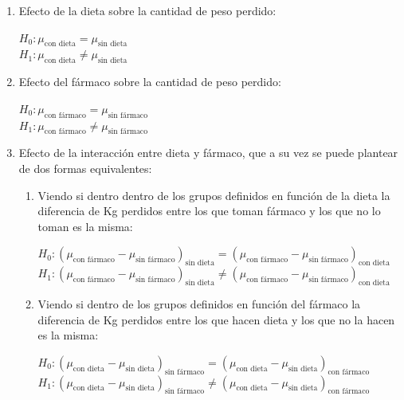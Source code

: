 \documentclass[
  a4paper,
]{scrreport}
\theoremstyle{plain}
\theoremstyle{definition}
\theoremstyle{definition}
\theoremstyle{remark}
\begin{document}
\begin{enumerate}
\def\labelenumi{\arabic{enumi}.}
\item
  Efecto de la dieta sobre la cantidad de peso perdido:

  \(H_0: \mu_{\text{con dieta}}=\mu_{\text{sin dieta}}\)\\
  \(H_1: \mu_{\text{con dieta}}\neq\mu_{\text{sin dieta}}\)
\item
  Efecto del fármaco sobre la cantidad de peso perdido:

  \(H_0: \mu_{\text{con fármaco}}=\mu_{\text{sin fármaco}}\)\\
  \(H_1: \mu_{\text{con fármaco}}\neq\mu_{\text{sin fármaco}}\)
\item
  Efecto de la interacción entre dieta y fármaco, que a su vez se puede
  plantear de dos formas equivalentes:

  \begin{enumerate}
  \def\labelenumii{\alph{enumii}.}
  \item
    Viendo si dentro dentro de los grupos definidos en función de la
    dieta la diferencia de Kg perdidos entre los que toman fármaco y los
    que no lo toman es la misma:

    \(H_0: (\mu_{\text{con fármaco}}-\mu_{\text{sin fármaco}})_{\text{sin dieta}}=(\mu_{\text{con fármaco}}-\mu_{\text{sin fármaco}})_{\text{con dieta}}\)\\
    \(H_1: (\mu_{\text{con fármaco}}-\mu_{\text{sin fármaco}})_{\text{sin dieta}}\neq(\mu_{\text{con fármaco}}-\mu_{\text{sin fármaco}})_{\text{con dieta}}\)
  \item
    Viendo si dentro de los grupos definidos en función del fármaco la
    diferencia de Kg perdidos entre los que hacen dieta y los que no la
    hacen es la misma:

    \(H_0: (\mu_{\text{con dieta}}-\mu_{\text{sin dieta}})_{\text{sin fármaco}}=(\mu_{\text{con dieta}}-\mu_{\text{sin dieta}})_{\text{con fármaco}}\)\\
    \(H_1: (\mu_{\text{con dieta}}-\mu_{\text{sin dieta}})_{\text{sin fármaco}}\neq(\mu_{\text{con dieta}}-\mu_{\text{sin dieta}})_{\text{con fármaco}}\)
  \end{enumerate}
\end{enumerate}
\end{document}
